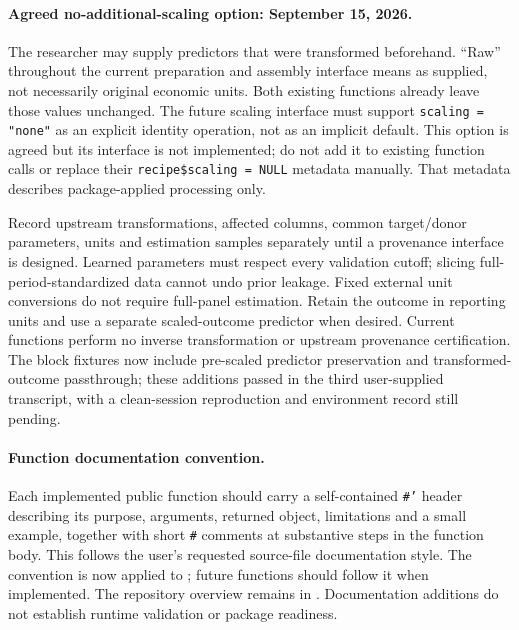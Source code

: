 \documentclass[11pt]{article}
\begin{document}
\paragraph{Agreed no-additional-scaling option: September 15, 2026.}
The researcher may supply predictors that were transformed beforehand.
``Raw'' throughout the current preparation and assembly interface means
as supplied, not necessarily original economic units. Both existing
functions already leave those values unchanged. The future scaling
interface must support \texttt{scaling = "none"} as an explicit identity
operation, not as an implicit default. This option is agreed but its
interface is not implemented; do not add it to existing function calls
or replace their \texttt{recipe\$scaling = NULL} metadata manually.
That metadata describes package-applied processing only.

Record upstream transformations, affected columns, common target/donor
parameters, units and estimation samples separately until a provenance
interface is designed. Learned parameters must respect every validation
cutoff; slicing full-period-standardized data cannot undo prior leakage.
Fixed external unit conversions do not require full-panel estimation.
Retain the outcome in reporting units and use a separate scaled-outcome
predictor when desired. Current functions perform no inverse transformation
or upstream provenance certification. The block fixtures now include
pre-scaled predictor preservation and transformed-outcome passthrough;
these additions passed in the third user-supplied transcript, with a
clean-session reproduction and environment record still pending.

\paragraph{Function documentation convention.}
Each implemented public function should carry a self-contained
\texttt{\#'} header describing its purpose, arguments, returned object,
limitations and a small example, together with short \texttt{\#} comments
at substantive steps in the function body. This follows the user's requested
source-file documentation style. The convention is now applied to
; future functions should follow it when implemented.
The repository overview remains in . Documentation additions
do not establish runtime validation or package readiness.
\end{document}
